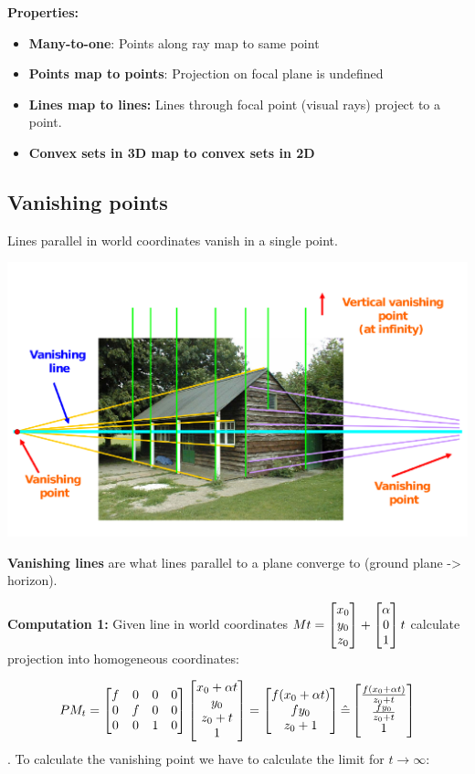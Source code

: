 \textbf{Properties:}\begin{itemize}
    \item \textbf{Many-to-one}: Points along ray map to same point
    \item \textbf{Points map to points}: Projection on focal plane is undefined
    \item \textbf{Lines map to lines:} Lines through focal point (visual rays) project to a point.
    \item \textbf{Convex sets in 3D map to convex sets in 2D}
\end{itemize}

\subsection{Vanishing points}

Lines parallel in world coordinates vanish in a single point.

\includegraphics[width=\textwidth]{images/chap7/vanishing_points}

\textbf{Vanishing lines} are what lines parallel to a plane converge to (ground plane -> horizon).

\textbf{Computation 1:} Given line in world coordinates $Mt = \left[\begin{matrix}x_0 \\ y_0 \\ z_0\end{matrix}\right] + \left[\begin{matrix}\alpha \\ 0 \\ 1\end{matrix}\right]t$ calculate projection into homogeneous coordinates:

$$PM_t = \left[\begin{matrix}f&0&0&0 \\ 0&f&0&0 \\ 0&0&1&0\end{matrix}\right] \left[\begin{matrix}x_0 + \alpha t \\ y_0 \\ z_0 + t \\ 1\end{matrix}\right] = \left[\begin{matrix}f(x_0 + \alpha t) \\ fy_0 \\ z_0 + 1\end{matrix}\right] \hat{=} \left[\begin{matrix}\frac{f(x_0 + \alpha t)}{z_0 + t} \\ \frac{fy_0}{z_0 + t} \\ 1\end{matrix}\right]$$. To calculate the vanishing point we have to calculate the limit for $t \rightarrow \infty$:

